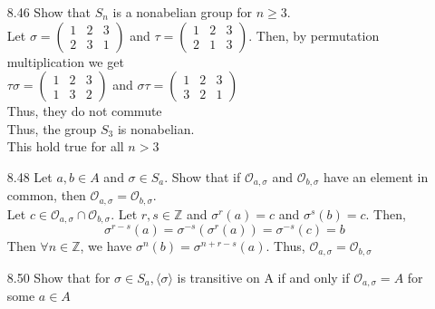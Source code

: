 \documentclass[12pt]{article}
\newcommand{\Z}{\mathds{Z}}
\begin{document}
\begin{enumerate}

	\item[8.46] Show that $ S_n $ is a nonabelian group for $ n \geq  3$.\\
	Let
	$\sigma=
	\begin{pmatrix}
		1 & 2 & 3 \\
		2 & 3 & 1 
	\end{pmatrix}  $
	and
	$\tau=	\begin{pmatrix}
	1 & 2 & 3 \\
	2 & 1 & 3 
	\end{pmatrix}$.
	Then, by permutation multiplication we get\\
	$\tau\sigma=\begin{pmatrix}
	1 & 2 & 3 \\
	1 & 3 & 2 
	\end{pmatrix}$
	and $\sigma\tau=\begin{pmatrix}
	1 & 2 & 3 \\
	3 & 2 & 1 
	\end{pmatrix}$\\
	Thus, they do not commute\\
	Thus, the group
	$S_3$ is nonabelian. \\
	This hold true for all $ n > 3 $
	\item[8.48] Let $ a,b \in A $ and $ \sigma \in S_a $. Show that if $ \mathcal{O}_{a,\sigma} $ and $ \mathcal{O}_{b,\sigma} $ have an element in common, then $ \mathcal{O}_{a,\sigma}  = \mathcal{O}_{b,\sigma}$.\\
		Let $ c \in \mathcal{O}_{a,\sigma}\cap\mathcal{O}_{b,\sigma} $. Let $ r,s\in\Z $ and $ \sigma^r(a)=c $ and $ \sigma^s(b)=c $. Then, 
		\[\sigma^{r-s}(a)=\sigma^{-s}(\sigma^r(a))=\sigma^{-s}(c)=b\]
		Then $ \forall n \in \Z $, we have $ \sigma^n(b)=\sigma^{n+r-s}(a) $.
		Thus, $\mathcal{O}_{a,\sigma}  = \mathcal{O}_{b,\sigma}$
	\item[8.50] Show that for $ \sigma \in S_a, \langle \sigma \rangle $ is transitive on A if and only if $ \mathcal{O}_{a,\sigma}=A $ for some $ a\in A $\\

\end{enumerate}
\end{document}
